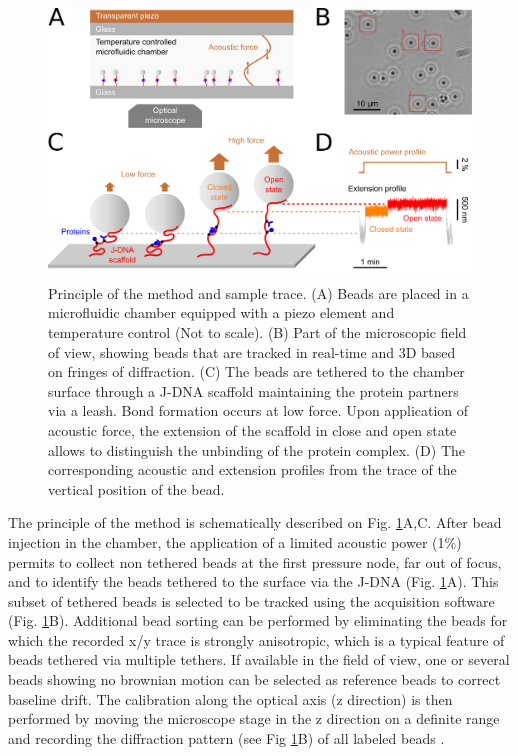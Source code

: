 \documentclass{biophys-new}
\begin{document}
\begin{figure}[hbt!]
	\centering
	\includegraphics[width=0.75\linewidth]{Figures/fig1.png}
	\caption{Principle of the method and sample trace. (A) Beads are placed in a microfluidic chamber equipped with a piezo element and temperature control (Not to scale). (B) Part of the microscopic field of view, showing beads that are tracked in real-time and 3D based on fringes of diffraction. (C) The beads are tethered to the chamber surface through a J-DNA scaffold maintaining the protein partners via a leash. Bond formation occurs at low force. Upon application of acoustic force, the extension of the scaffold in close and open state allows to distinguish the unbinding of the protein complex. (D) The corresponding acoustic and extension profiles from the trace of the vertical position of the bead. }
	\label{fig:principle}
\end{figure}
 
The principle of the method is schematically described on Fig. \ref{fig:principle}A,C. After bead injection in the chamber, the application of a limited acoustic power (1\%) permits to collect non tethered beads at the first pressure node, far out of focus, and to identify the beads tethered to the surface via the J-DNA (Fig. \ref{fig:principle}A). This subset of tethered beads is selected to be tracked using the acquisition software (Fig. \ref{fig:principle}B). Additional bead sorting can be performed by eliminating the beads for which the recorded x/y trace is strongly anisotropic, which is a typical feature of beads tethered via multiple tethers. If available in the field of view, one or several beads showing no brownian motion can be selected as reference beads to correct baseline drift. The calibration along the optical axis (z direction) is then performed by moving the microscope stage in the z direction on a definite range and recording the diffraction pattern (see Fig \ref{fig:principle}B) of all labeled beads \cite{gosse2002, sitters2015}. 
\end{document}
